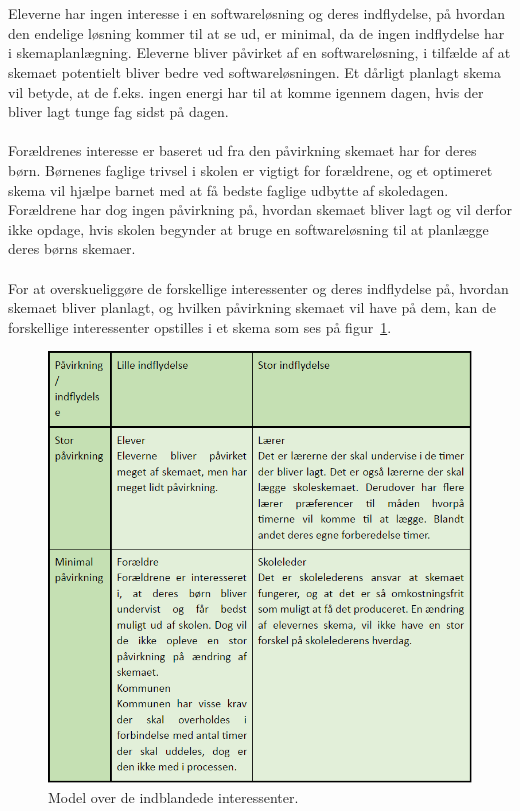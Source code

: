 \\\\
Eleverne har ingen interesse i en softwareløsning og deres indflydelse, på hvordan den endelige løsning kommer til at se ud, er minimal, da de ingen indflydelse har i skemaplanlægning. Eleverne bliver påvirket af en softwareløsning, i tilfælde af at skemaet potentielt bliver bedre ved softwareløsningen. Et dårligt planlagt skema vil betyde, at de f.eks. ingen energi har til at komme igennem dagen, hvis der bliver lagt tunge fag sidst på dagen.
\\\\
Forældrenes interesse er baseret ud fra den påvirkning skemaet har for deres børn. Børnenes faglige trivsel i skolen er vigtigt for forældrene, og et optimeret skema vil hjælpe barnet med at få bedste faglige udbytte af skoledagen. Forældrene har dog ingen påvirkning på, hvordan skemaet bliver lagt og vil derfor ikke opdage, hvis skolen begynder at bruge en softwareløsning til at planlægge deres børns skemaer.
\\\\
For at overskueliggøre de forskellige interessenter og deres indflydelse på, hvordan skemaet bliver planlagt, og hvilken påvirkning skemaet vil have på dem, kan de forskellige interessenter opstilles i et skema som ses på figur~\ref{fig:interessenter}.
\begin{figure}[h]
  \centering
  \includegraphics[scale = 0.8]{partials/graphics/interessentanalyse.png}
  \caption{Model over de indblandede interessenter.}
  \label{fig:interessenter}
\end{figure}
